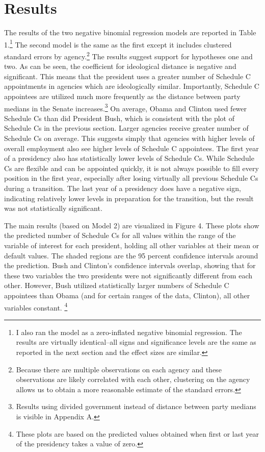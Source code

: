 \documentclass[12pt]{article}
\begin{document}
\section*{Results}
The results of the two negative binomial regression models are reported in Table 1.\footnote{I also ran the model as a zero-inflated negative binomial regression. The results are virtually identical--all signs and significance levels are the same as reported in the next section and the effect sizes are similar.} The second model is the same as the first except it includes clustered standard errors by agency.\footnote{Because there are multiple observations on each agency and these observations are likely correlated with each other, clustering on the agency allows us to obtain a more reasonable estimate of the standard errors.} The results suggest support for hypotheses one and two. As can be seen, the coefficient for ideological distance is negative and significant. This means that the president uses a greater number of Schedule C appointments in agencies which are ideologically similar. Importantly, Schedule C appointees are utilized much more frequently as the distance between party medians in the Senate increases.\footnote{Results using divided government instead of distance between party medians is visible in Appendix A.} On average, Obama and Clinton used fewer Schedule Cs than did President Bush, which is consistent with the plot of Schedule Cs in the previous section. Larger agencies receive greater number of Schedule Cs on average. This suggests simply that agencies with higher levels of overall employment also see higher levels of Schedule C appointees. The first year of a presidency also has statistically lower levels of Schedule Cs. While Schedule Cs are flexible and can be appointed quickly, it is not always possible to fill every position in the first year, especially after losing virtually all previous Schedule Cs during a transition. The last year of a presidency does have a negative sign, indicating relatively lower levels in preparation for the transition, but the result was not statistically significant. 

The main results (based on Model 2) are visualized in Figure 4. These plots show the predicted number of Schedule Cs for all values within the range of the variable of interest for each president, holding all other variables at their mean or default values. The shaded regions are the 95 percent confidence intervals around the prediction. Bush and Clinton's confidence intervals overlap, showing that for these two variables the two presidents were not significantly different from each other. However, Bush utilized statistically larger numbers of Schedule C appointees than Obama (and for certain ranges of the data, Clinton), all other variables constant. \footnote{These plots are based on the predicted values obtained when first or last year of the presidency takes a value of zero.} 
\end{document}
